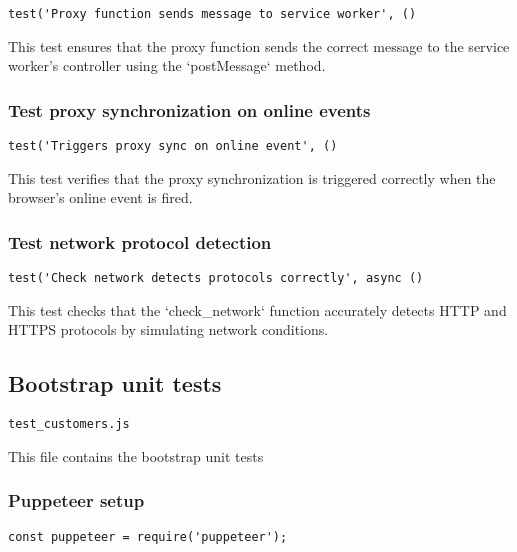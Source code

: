 \documentclass[a4paper]{article}
\begin{document}
\begin{lstlisting}
test('Proxy function sends message to service worker', ()
\end{lstlisting}

This test ensures that the proxy function sends the correct message
to the service worker's controller using the `postMessage` method.

\hypertarget{toc106}{}
\subsubsection{Test proxy synchronization on online events}

\begin{lstlisting}
test('Triggers proxy sync on online event', ()
\end{lstlisting}

This test verifies that the proxy synchronization is triggered correctly
when the browser's online event is fired.

\hypertarget{toc107}{}
\subsubsection{Test network protocol detection}

\begin{lstlisting}
test('Check network detects protocols correctly', async ()
\end{lstlisting}

This test checks that the `check\_network` function accurately detects
HTTP and HTTPS protocols by simulating network conditions.

\hypertarget{toc108}{}
\subsection{Bootstrap unit tests}

\begin{lstlisting}
test_customers.js
\end{lstlisting}

This file contains the bootstrap unit tests

\hypertarget{toc109}{}
\subsubsection{Puppeteer setup}

\begin{lstlisting}
const puppeteer = require('puppeteer');
\end{lstlisting}
\end{document}
